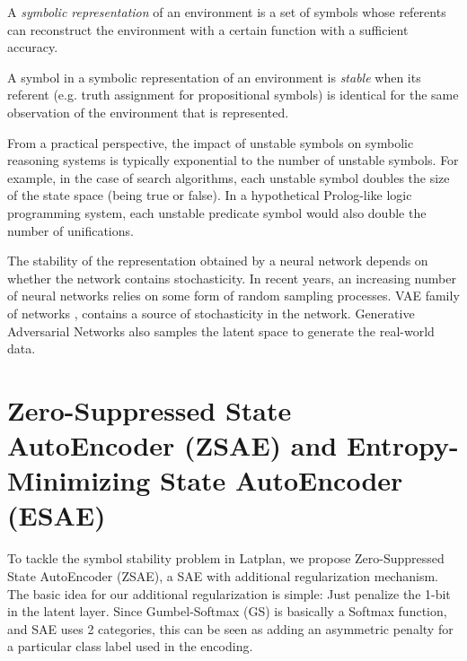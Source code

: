 \begin{defi}
A \emph{symbolic representation} of an environment is a set of symbols
whose referents can reconstruct the environment with a certain function with a sufficient accuracy.
\end{defi}

\begin{defi}
A symbol in a symbolic representation of an environment is \emph{stable}
when its referent (e.g. truth assignment for propositional symbols) is identical
for the same observation of the environment that is represented.
\end{defi}

From a practical perspective, 
the impact of unstable symbols on symbolic reasoning systems is typically exponential to the number of unstable symbols.
For example, in the case of search algorithms, each unstable symbol doubles the size of the state space (being true or false).
In a hypothetical Prolog-like logic programming system, each unstable predicate symbol would also double the
number of unifications.


The stability of the representation obtained by a neural network depends
on whether the network contains stochasticity.  In recent years,
an increasing number of neural networks relies on some form of random
sampling processes.  VAE family of networks
\cite{kingma2013auto,jang2016categorical,higgins2016beta},
contains a source of stochasticity in the network. Generative
Adversarial Networks \cite[GAN]{goodfellow2014generative} also samples
the latent space to generate the real-world data.


\section{Zero-Suppressed State AutoEncoder (ZSAE) and Entropy-Minimizing State AutoEncoder (ESAE)}
\label{zsae}

To tackle the symbol stability problem in Latplan, we propose Zero-Suppressed State AutoEncoder (ZSAE),
a SAE with additional regularization mechanism.
The basic idea for our additional regularization is simple: Just penalize the
1-bit in the latent layer. Since Gumbel-Softmax (GS) is basically a Softmax function,
and SAE uses 2 categories, this can be seen as adding an
asymmetric penalty for a particular class label used in the encoding.

